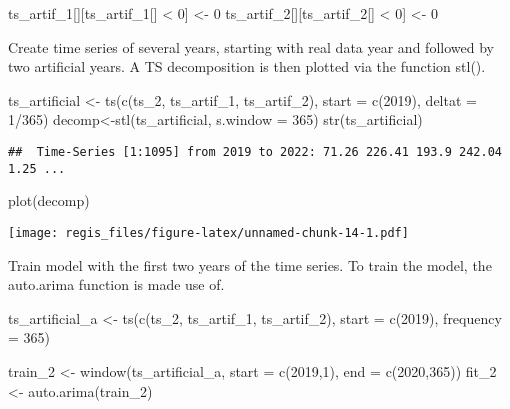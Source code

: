 \documentclass[
]{article}
\newenvironment{Shaded}{\begin{snugshade}}{\end{snugshade}}
\newcommand{\AttributeTok}[1]{\textcolor[rgb]{0.77,0.63,0.00}{#1}}
\newcommand{\DecValTok}[1]{\textcolor[rgb]{0.00,0.00,0.81}{#1}}
\newcommand{\FunctionTok}[1]{\textcolor[rgb]{0.00,0.00,0.00}{#1}}
\newcommand{\NormalTok}[1]{#1}
\newcommand{\OtherTok}[1]{\textcolor[rgb]{0.56,0.35,0.01}{#1}}
\newcommand{\SpecialCharTok}[1]{\textcolor[rgb]{0.00,0.00,0.00}{#1}}
\begin{document}
\begin{Shaded}
\begin{Highlighting}[]
\NormalTok{ts\_artif\_1[][ts\_artif\_1[] }\SpecialCharTok{\textless{}} \DecValTok{0}\NormalTok{] }\OtherTok{\textless{}{-}} \DecValTok{0}
\NormalTok{ts\_artif\_2[][ts\_artif\_2[] }\SpecialCharTok{\textless{}} \DecValTok{0}\NormalTok{] }\OtherTok{\textless{}{-}} \DecValTok{0}
\end{Highlighting}
\end{Shaded}

Create time series of several years, starting with real data year and
followed by two artificial years. A TS decomposition is then plotted via
the function stl().

\begin{Shaded}
\begin{Highlighting}[]
\NormalTok{ts\_artificial }\OtherTok{\textless{}{-}} \FunctionTok{ts}\NormalTok{(}\FunctionTok{c}\NormalTok{(ts\_2, ts\_artif\_1, ts\_artif\_2), }\AttributeTok{start =} \FunctionTok{c}\NormalTok{(}\DecValTok{2019}\NormalTok{), }\AttributeTok{deltat =} \DecValTok{1}\SpecialCharTok{/}\DecValTok{365}\NormalTok{)}
\NormalTok{decomp}\OtherTok{\textless{}{-}}\FunctionTok{stl}\NormalTok{(ts\_artificial, }\AttributeTok{s.window =} \DecValTok{365}\NormalTok{)}
\FunctionTok{str}\NormalTok{(ts\_artificial)}
\end{Highlighting}
\end{Shaded}

\begin{verbatim}
##  Time-Series [1:1095] from 2019 to 2022: 71.26 226.41 193.9 242.04 1.25 ...
\end{verbatim}

\begin{Shaded}
\begin{Highlighting}[]
\FunctionTok{plot}\NormalTok{(decomp)}
\end{Highlighting}
\end{Shaded}

\texttt{[image: regis\_files/figure-latex/unnamed-chunk-14-1.pdf]}

Train model with the first two years of the time series. To train the
model, the auto.arima function is made use of.

\begin{Shaded}
\begin{Highlighting}[]
\NormalTok{ts\_artificial\_a }\OtherTok{\textless{}{-}} \FunctionTok{ts}\NormalTok{(}\FunctionTok{c}\NormalTok{(ts\_2, ts\_artif\_1, ts\_artif\_2), }\AttributeTok{start =} \FunctionTok{c}\NormalTok{(}\DecValTok{2019}\NormalTok{), }\AttributeTok{frequency =} \DecValTok{365}\NormalTok{)}

\NormalTok{train\_2 }\OtherTok{\textless{}{-}} \FunctionTok{window}\NormalTok{(ts\_artificial\_a, }\AttributeTok{start =} \FunctionTok{c}\NormalTok{(}\DecValTok{2019}\NormalTok{,}\DecValTok{1}\NormalTok{), }\AttributeTok{end =} \FunctionTok{c}\NormalTok{(}\DecValTok{2020}\NormalTok{,}\DecValTok{365}\NormalTok{))}
\NormalTok{fit\_2 }\OtherTok{\textless{}{-}} \FunctionTok{auto.arima}\NormalTok{(train\_2)}
\end{Highlighting}
\end{Shaded}
\end{document}
